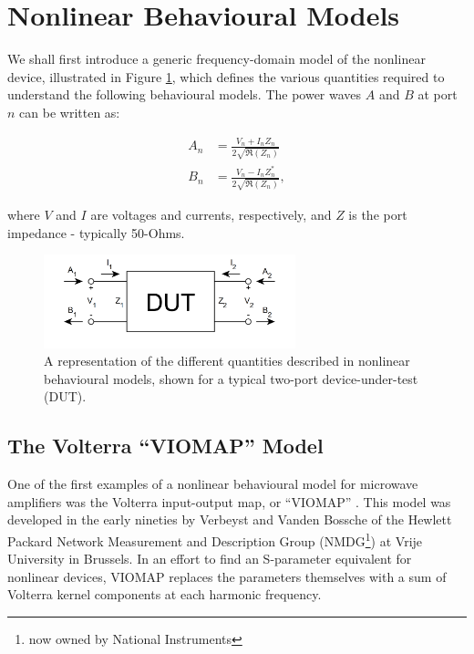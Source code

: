 \documentclass[../thesis/thesis.tex]{subfiles}
\begin{document}
\section{Nonlinear Behavioural Models}

We shall first introduce a generic frequency-domain model of the nonlinear device, illustrated in Figure \ref{ch5_fig_dut}, which defines the various quantities required to understand the following behavioural models. The power waves $A$ and $B$ at port $n$ can be written as:

\begin{align}
	A_n &= \frac{V_n + I_n Z_n}{2\sqrt{\Re(Z_n)}} \\
	B_n &= \frac{V_n - I_n Z^*_n}{2\sqrt{\Re(Z_n)}},
\end{align}

where $V$ and $I$ are voltages and currents, respectively, and $Z$ is the port impedance - typically 50-Ohms.

\begin{figure}
	\centering
	\includegraphics[width=0.65\textwidth]{dut}
	\caption[Device-under-test model representation.]{A representation of the different quantities described in nonlinear behavioural models, shown for a typical two-port device-under-test (DUT).}
	\label{ch5_fig_dut}
\end{figure}

\subsection{The Volterra ``VIOMAP'' Model}

One of the first examples of a nonlinear behavioural model for microwave amplifiers was the Volterra input-output map, or ``VIOMAP'' \cite{Verbeyst_1994}. This model was developed in the early nineties by Verbeyst and Vanden Bossche of the Hewlett Packard Network Measurement and Description Group (NMDG\footnote{now owned by National Instruments}) at Vrije University in Brussels. In an effort to find an S-parameter equivalent for nonlinear devices, VIOMAP replaces the parameters themselves with a sum of Volterra kernel components at each harmonic frequency\cite{Schetzen_2006, Moodi_2010}.
\end{document}
